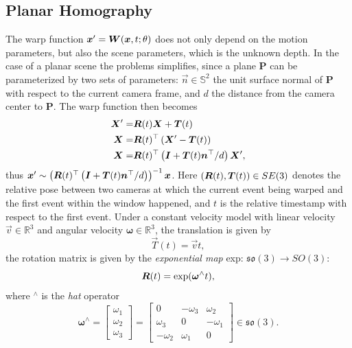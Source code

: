 \subsection{Planar Homography}

\label{sec:planar_homo}
The warp function $\vec{x}'=\mat{W}(\vec{x},t;\theta)$ does not only
depend on the motion parameters, but also the scene parameters, which
is the unknown depth.  In the case of a planar scene the problems
simplifies, since a plane $\mathbf{P}$ can be parameterized by two
sets of parameters: $\vec{n}\in\mathbb{S}^2$ the unit surface normal
of $\mathbf{P}$ with respect to the current camera frame, and $d$ the
distance from the camera center to $\mathbf{P}$. The warp function
then becomes
\begin{align}
  \vec{X}'=&\mat{R}(t)\vec{X}+\vec{T}(t)\\
  \vec{X}=&\mat{R}(t)^\top\left(\vec{X}'-\vec{T}(t)\right)\\
  \vec{X}=&\mat{R}(t)^\top\left(\mat{I}+\vec{T}(t)\vec{n}^\top/d\right)\vec{X}',  \label{eq:planar_homo_0}
\end{align}
thus
$\vec{x}'\sim\left(\mat{R}(t)^\top\left(\mat{I}+\vec{T}(t)\vec{n}^\top/d\right)\right)^{-1}\vec{x}$.
Here $(\mat{R}(t), \vec{T}(t))\in SE(3)$ denotes the relative pose
between two cameras at which the current event being warped and the
first event within the window happened, and $t$ is the relative
timestamp with respect to the first event. Under a constant velocity
model with linear velocity $\vec{v}\in\mathbb{R}^3$ and angular
velocity $\bm{\omega}\in\mathbb{R}^3$, the translation is given by
\begin{equation}
  \label{eq:translation}
  \vec{T}(t)=\vec{v}t,
\end{equation}
the rotation matrix is given by the \textit{exponential map} exp:
$\mathfrak{so}(3)\rightarrow SO(3)$:
\begin{equation}
  \label{eq:rotation}
  \mat{R}(t)=\mathrm{exp}(\bm{\omega}^\wedge t),
\end{equation}
where $^\wedge$ is the \textit{hat} operator
\begin{equation}
  \label{eq:hat}
  \bm{\omega}^\wedge=
  \begin{bmatrix}
    \omega_1\\\omega_2\\\omega_3
  \end{bmatrix}
  =
  \begin{bmatrix}
    0&-\omega_3&\omega_2\\
    \omega_3&0&-\omega_1\\
    -\omega_2&\omega_1&0
  \end{bmatrix}
  \in\mathfrak{so}(3).
\end{equation}

